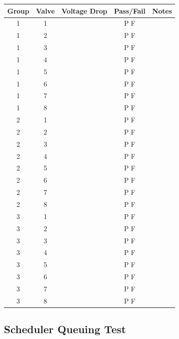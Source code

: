 \documentclass{article}
\begin{document}
\begin{enumerate}
	\begin{tabular}{|c|c|c|c|c|}
		\hline
		Group & Valve & Voltage Drop & Pass/Fail & Notes \\
		\hline
		1 & 1 &  & P \quad F & \hspace{20em} \\
		\hline
		1 & 2 &  & P \quad F & \\
		\hline
		1 & 3 &  & P \quad F & \\
		\hline
		1 & 4 &  & P \quad F & \\
		\hline
		1 & 5 &  & P \quad F & \\
		\hline
		1 & 6 &  & P \quad F & \\
		\hline
		1 & 7 &  & P \quad F & \\
		\hline
		1 & 8 &  & P \quad F & \\
		\hline
		\hline
		2 & 1 &  & P \quad F & \\
		\hline
		2 & 2 &  & P \quad F & \\
		\hline
		2 & 3 &  & P \quad F & \\
		\hline
		2 & 4 &  & P \quad F & \\
		\hline
		2 & 5 &  & P \quad F & \\
		\hline
		2 & 6 &  & P \quad F & \\
		\hline
		2 & 7 &  & P \quad F & \\
		\hline
		2 & 8 &  & P \quad F & \\
		\hline
		\hline
		3 & 1 &  & P \quad F & \\
		\hline
		3 & 2 &  & P \quad F & \\
		\hline
		3 & 3 &  & P \quad F & \\
		\hline
		3 & 4 &  & P \quad F & \\
		\hline
		3 & 5 &  & P \quad F & \\
		\hline
		3 & 6 &  & P \quad F & \\
		\hline
		3 & 7 &  & P \quad F & \\
		\hline
		3 & 8 &  & P \quad F & \\
		\hline
	\end{tabular}

\end{enumerate}

\clearpage
\subsection{Scheduler Queuing Test}
\end{document}
